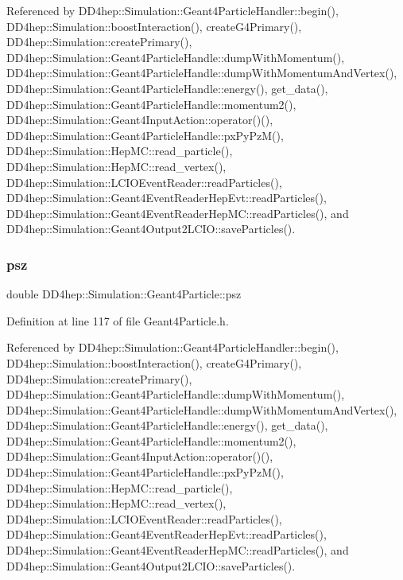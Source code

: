Referenced by D\+D4hep\+::\+Simulation\+::\+Geant4\+Particle\+Handler\+::begin(), D\+D4hep\+::\+Simulation\+::boost\+Interaction(), create\+G4\+Primary(), D\+D4hep\+::\+Simulation\+::create\+Primary(), D\+D4hep\+::\+Simulation\+::\+Geant4\+Particle\+Handle\+::dump\+With\+Momentum(), D\+D4hep\+::\+Simulation\+::\+Geant4\+Particle\+Handle\+::dump\+With\+Momentum\+And\+Vertex(), D\+D4hep\+::\+Simulation\+::\+Geant4\+Particle\+Handle\+::energy(), get\+\_\+data(), D\+D4hep\+::\+Simulation\+::\+Geant4\+Particle\+Handle\+::momentum2(), D\+D4hep\+::\+Simulation\+::\+Geant4\+Input\+Action\+::operator()(), D\+D4hep\+::\+Simulation\+::\+Geant4\+Particle\+Handle\+::px\+Py\+Pz\+M(), D\+D4hep\+::\+Simulation\+::\+Hep\+M\+C\+::read\+\_\+particle(), D\+D4hep\+::\+Simulation\+::\+Hep\+M\+C\+::read\+\_\+vertex(), D\+D4hep\+::\+Simulation\+::\+L\+C\+I\+O\+Event\+Reader\+::read\+Particles(), D\+D4hep\+::\+Simulation\+::\+Geant4\+Event\+Reader\+Hep\+Evt\+::read\+Particles(), D\+D4hep\+::\+Simulation\+::\+Geant4\+Event\+Reader\+Hep\+M\+C\+::read\+Particles(), and D\+D4hep\+::\+Simulation\+::\+Geant4\+Output2\+L\+C\+I\+O\+::save\+Particles().

\hypertarget{class_d_d4hep_1_1_simulation_1_1_geant4_particle_a1caec949ea63cfe52c101007c0ebcaea}{}\label{class_d_d4hep_1_1_simulation_1_1_geant4_particle_a1caec949ea63cfe52c101007c0ebcaea} 
\subsubsection{\texorpdfstring{psz}{psz}}
{\footnotesize\ttfamily double D\+D4hep\+::\+Simulation\+::\+Geant4\+Particle\+::psz}



Definition at line 117 of file Geant4\+Particle.\+h.



Referenced by D\+D4hep\+::\+Simulation\+::\+Geant4\+Particle\+Handler\+::begin(), D\+D4hep\+::\+Simulation\+::boost\+Interaction(), create\+G4\+Primary(), D\+D4hep\+::\+Simulation\+::create\+Primary(), D\+D4hep\+::\+Simulation\+::\+Geant4\+Particle\+Handle\+::dump\+With\+Momentum(), D\+D4hep\+::\+Simulation\+::\+Geant4\+Particle\+Handle\+::dump\+With\+Momentum\+And\+Vertex(), D\+D4hep\+::\+Simulation\+::\+Geant4\+Particle\+Handle\+::energy(), get\+\_\+data(), D\+D4hep\+::\+Simulation\+::\+Geant4\+Particle\+Handle\+::momentum2(), D\+D4hep\+::\+Simulation\+::\+Geant4\+Input\+Action\+::operator()(), D\+D4hep\+::\+Simulation\+::\+Geant4\+Particle\+Handle\+::px\+Py\+Pz\+M(), D\+D4hep\+::\+Simulation\+::\+Hep\+M\+C\+::read\+\_\+particle(), D\+D4hep\+::\+Simulation\+::\+Hep\+M\+C\+::read\+\_\+vertex(), D\+D4hep\+::\+Simulation\+::\+L\+C\+I\+O\+Event\+Reader\+::read\+Particles(), D\+D4hep\+::\+Simulation\+::\+Geant4\+Event\+Reader\+Hep\+Evt\+::read\+Particles(), D\+D4hep\+::\+Simulation\+::\+Geant4\+Event\+Reader\+Hep\+M\+C\+::read\+Particles(), and D\+D4hep\+::\+Simulation\+::\+Geant4\+Output2\+L\+C\+I\+O\+::save\+Particles().

